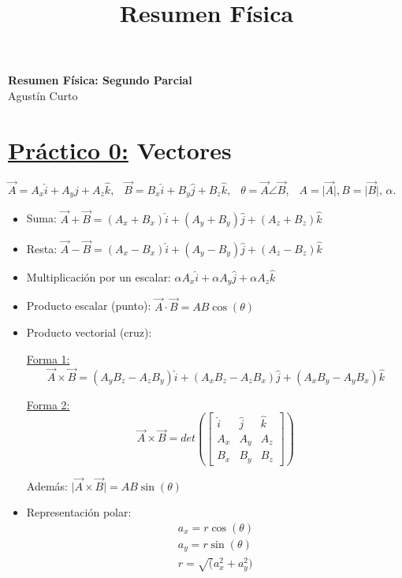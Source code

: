 \documentclass[12pt,a4paper]{article}
\title{Resumen Física}
\providecommand{\abs}[1]{\lvert#1\rvert}
\newcommand{\PN}{\par\noindent}
\begin{document}
	\begin{center}
		\Huge \textbf{Resumen Física: Segundo Parcial} \\
		\large Agustín Curto
	\end{center}

	\section*{\underline{Práctico 0:} Vectores}
		\PN $\vec{A} = A_{x} \hat{i} + A_{y} \hat{j} + A_{z} \hat{k}$, $\;$ $\vec{B} = B_{x} \hat{i} + B_{y} \hat{j} +
			B_{z} \hat{k}$, $\;$ $\theta = \vec{A} \angle \vec{B}$, $\;$ $A = \abs{\vec{A}}, B = \abs{\vec{B}}$, $\alpha$.
		\begin{multicols}{2}
			\begin{itemize}
				\item Suma: $\vec{A} + \vec{B} = (A_{x} + B_{x}) \hat{i} + (A_{y} + B_{y}) \hat{j} + (A_{z} + B_{z}) \hat{k}$
				\item Resta: $\vec{A} - \vec{B} = (A_{x} - B_{x}) \hat{i} + (A_{y} - B_{y}) \hat{j} + (A_{z} - B_{z}) \hat{k}$
				\item Multiplicación por un escalar: $\alpha A_{x} \hat{i} + \alpha A_{y} \hat{j} + \alpha A_{z} \hat{k}$
				\item Producto escalar (punto): $\vec{A} \cdot \vec{B} = AB \cos(\theta)$
				\item Producto vectorial (cruz):
					\PN \underline{Forma 1:}
					\[
						\vec{A} \times \vec{B} = (A_{y}B_{z} - A_{z}B_{y}) \hat{i} + (A_{x}B_{z} - A_{z}B_{x}) \hat{j} +
						(A_{x}B_{y} - A_{y}B_{x}) \hat{k}
					\]

					\PN \underline{Forma 2:}
						\[
							\vec{A} \times \vec{B} = det
								\left(
								  \begin{bmatrix}
								    \hat{i} & \hat{j} & \hat{k} \\
								    A_{x} & A_{y} & A_{z} \\
								    B_{x} & B_{y} & B_{z}
								  \end{bmatrix}
								\right)
						\]
					\PN Además: $\abs{\vec{A} \times \vec{B}} = AB \sin(\theta)$
				\item Representación polar:
					\begin{eqnarray*}
						a_{x} = r \cos(\theta) \\
						a_{y} = r \sin(\theta) \\
						r = \sqrt(a_{x}^{2} + a_{y}^{2})
					\end{eqnarray*}
			\end{itemize}
		\end{multicols}
\end{document}
